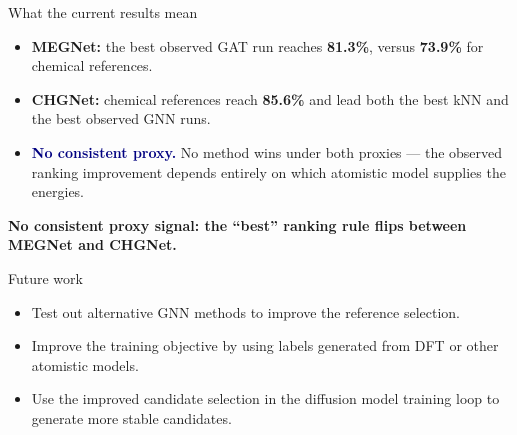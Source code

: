 \documentclass[10pt,aspectratio=169]{beamer}
\newcommand{\key}[1]{\textbf{\textcolor{navy}{#1}}}
\begin{document}
\begin{frame}{What the current results mean}
\begin{itemize}\setlength\itemsep{5mm}
\item \textbf{MEGNet:} the best observed GAT run reaches \textbf{81.3\%}, versus \textbf{73.9\%} for chemical references.
\item \textbf{CHGNet:} chemical references reach \textbf{85.6\%} and lead both the best kNN and the best observed GNN runs.
\item \key{No consistent proxy.} No method wins under both proxies --- the observed
ranking improvement depends entirely on which atomistic model supplies the energies.
\end{itemize}
\vspace{6mm}
\centering\large\color{navy}\textbf{No consistent proxy signal: the ``best'' ranking rule flips between MEGNet and CHGNet.}
\end{frame}

\begin{frame}{Future work}
\begin{itemize}\setlength\itemsep{6mm}
\item Test out alternative GNN methods to improve the reference selection.
\item Improve the training objective by using labels generated from DFT or other atomistic models.
\item Use the improved candidate selection in the diffusion model training loop to generate more stable candidates.
\end{itemize}
\end{frame}
\end{document}
